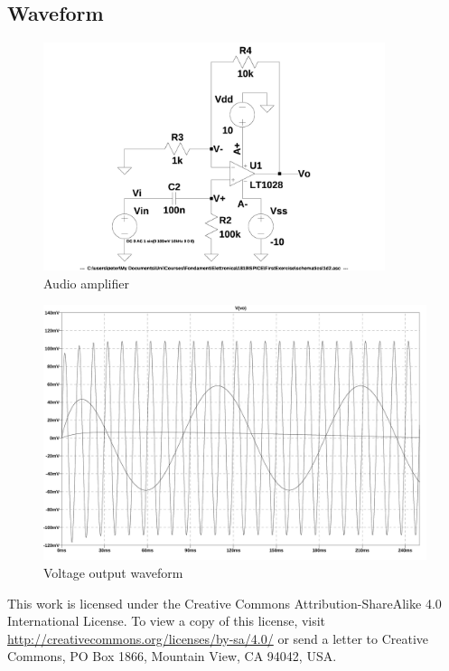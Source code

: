 \documentclass[10pt,a4paper]{article}
\begin{document}
\subsection{Waveform}
\begin{figure}[h]
  \centering
  \includegraphics[width=10cm]{schematics/1d2.jpg}
  \caption{Audio amplifier}
  \label{1d2}
\end{figure}



\begin{figure}[h]
  \centering
  \includegraphics[width=14cm]{graph/1d2.jpg}
  \caption{Voltage output waveform}
  \label{1d2}
\end{figure}

\vspace*{\fill}
\centering
\tiny{This work is licensed under the Creative Commons Attribution-ShareAlike
 4.0 International License. To view a copy of this license, visit
 \href{http://creativecommons.org/licenses/by-sa/4.0/}{http://creativecommons.org/licenses/by-sa/4.0/}
or send a letter to Creative Commons, PO Box 1866, Mountain View, CA 94042,
USA.}
\end{document}
